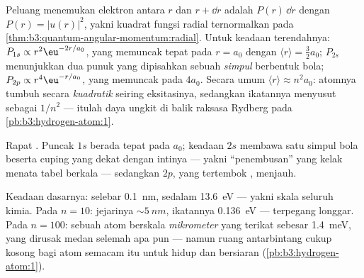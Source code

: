 \begin{proposition}\label{prop:b3:hydrogen-atom:radial}
Peluang menemukan elektron antara $r$ dan $r + \dd r$ adalah
$P(r)\,\dd r$ dengan $P(r) = |u(r)|^2$, yakni kuadrat fungsi radial
ternormalkan pada \cref{thm:b3:quantum-angular-momentum:radial}. Untuk
keadaan terendahnya:
$P_{1s} \propto r^2\eu^{-2r/a_0}$, yang memuncak tepat pada $r = a_0$
dengan $\langle r\rangle = \tfrac32 a_0$; $P_{2s}$ menunjukkan dua
punuk yang dipisahkan sebuah \emph{simpul} berbentuk bola; $P_{2p} \propto
r^4\eu^{-r/a_0}$, yang memuncak pada $4a_0$. Secara umum $\langle r\rangle
\approx n^2a_0$: atomnya tumbuh secara \emph{kuadratik} seiring
eksitasinya, sedangkan ikatannya menyusut sebagai $1/n^2$ --- itulah
daya ungkit di balik raksasa Rydberg pada \cref{pb:b3:hydrogen-atom:1}.
\end{proposition}
\admitted

\begin{omfigure}

{\small Rapat . Puncak $1s$ berada tepat pada
$a_0$; keadaan $2s$ membawa satu simpul bola beserta cuping yang dekat
dengan intinya --- yakni ``penembusan'' yang kelak menata tabel berkala
--- sedangkan $2p$, yang tertembok , menjauh.}
\end{omfigure}

\begin{example}\label{ex:b3:hydrogen-atom:sizes}
Keadaan dasarnya: selebar \qty{0.1}{nm}, sedalam \qty{13.6}{eV} ---
yakni skala seluruh kimia. Pada $n = 10$: jejarinya $\sim\qty{5}{nm}$,
ikatannya \qty{0.136}{eV} --- terpegang longgar. Pada $n = 100$: sebuah
atom berskala \emph{mikrometer} yang terikat sebesar \qty{1.4}{meV},
yang dirusak medan selemah apa pun --- namun ruang antarbintang cukup
kosong bagi atom semacam itu untuk hidup dan bersiaran
(\cref{pb:b3:hydrogen-atom:1}).
\end{example}

